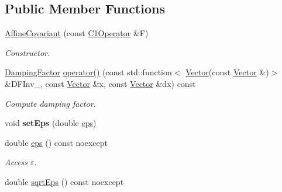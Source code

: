 \subsection*{Public Member Functions}
\begin{DoxyCompactItemize}
\item 
\hypertarget{classSpacy_1_1Newton_1_1Damping_1_1AffineCovariant_abf3615a91c70a145759d74eff761ec51}{}\hyperlink{classSpacy_1_1Newton_1_1Damping_1_1AffineCovariant_abf3615a91c70a145759d74eff761ec51}{Affine\+Covariant} (const \hyperlink{classSpacy_1_1C1Operator}{C1\+Operator} \&F)\label{classSpacy_1_1Newton_1_1Damping_1_1AffineCovariant_abf3615a91c70a145759d74eff761ec51}

\begin{DoxyCompactList}\small\item\em Constructor. \end{DoxyCompactList}\item 
\hypertarget{classSpacy_1_1Newton_1_1Damping_1_1AffineCovariant_a451040d8a986f1ae912b34713ced26ec}{}\hyperlink{classSpacy_1_1DampingFactor}{Damping\+Factor} \hyperlink{classSpacy_1_1Newton_1_1Damping_1_1AffineCovariant_a451040d8a986f1ae912b34713ced26ec}{operator()} (const std\+::function$<$ \hyperlink{classSpacy_1_1Vector}{Vector}(const \hyperlink{classSpacy_1_1Vector}{Vector} \&)$>$ \&D\+F\+Inv\+\_\+, const \hyperlink{classSpacy_1_1Vector}{Vector} \&x, const \hyperlink{classSpacy_1_1Vector}{Vector} \&dx) const \label{classSpacy_1_1Newton_1_1Damping_1_1AffineCovariant_a451040d8a986f1ae912b34713ced26ec}

\begin{DoxyCompactList}\small\item\em Compute damping factor. \end{DoxyCompactList}\item 
\hypertarget{classSpacy_1_1Mixin_1_1Eps_a1bbfd62541610d5d80f2782ab77158e4}{}void {\bfseries set\+Eps} (double \hyperlink{classSpacy_1_1Mixin_1_1Eps_a40e2ba8f3abd2b5370ef41238cfaaf8b}{eps})\label{classSpacy_1_1Mixin_1_1Eps_a1bbfd62541610d5d80f2782ab77158e4}

\item 
\hypertarget{classSpacy_1_1Mixin_1_1Eps_a40e2ba8f3abd2b5370ef41238cfaaf8b}{}double \hyperlink{classSpacy_1_1Mixin_1_1Eps_a40e2ba8f3abd2b5370ef41238cfaaf8b}{eps} () const noexcept\label{classSpacy_1_1Mixin_1_1Eps_a40e2ba8f3abd2b5370ef41238cfaaf8b}

\begin{DoxyCompactList}\small\item\em Access $\varepsilon$. \end{DoxyCompactList}\item 
\hypertarget{classSpacy_1_1Mixin_1_1Eps_a29e8c25dc3f1fdede57b8eb06f520fe1}{}double \hyperlink{classSpacy_1_1Mixin_1_1Eps_a29e8c25dc3f1fdede57b8eb06f520fe1}{sqrt\+Eps} () const noexcept\label{classSpacy_1_1Mixin_1_1Eps_a29e8c25dc3f1fdede57b8eb06f520fe1}


\end{DoxyCompactItemize}
